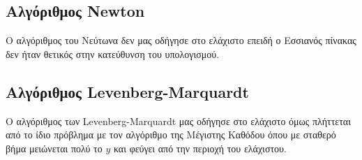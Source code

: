 \documentclass{report}
\begin{document}
\subsection{Αλγόριθμος Newton}
Ο αλγόριθμος του Νεύτωνα δεν μας οδήγησε στο ελάχιστο επειδή ο Εσσιανός πίνακας δεν ήταν θετικός
στην κατεύθυνση του υπολογισμού.

\subsection{Αλγόριθμος Levenberg-Marquardt}
Ο αλγόριθμος των Levenberg-Marquardt μας οδήγησε στο ελάχιστο
όμως πλήττεται από το ίδιο πρόβλημα με τον αλγόριθμο της Μέγιστης Καθόδου όπου με σταθερό βήμα μειώνεται 
πολύ το $y$ και φεύγει από την περιοχή του ελάχιστου.


\nocite{*} %


\end{document}
